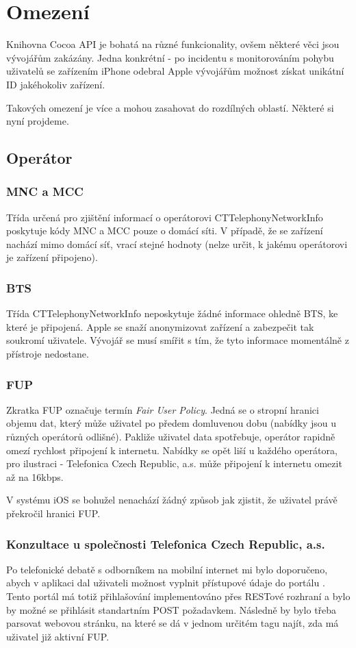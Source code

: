\newpage

\section{Omezení}
Knihovna Cocoa API je bohatá na různé funkcionality, ovšem některé věci jsou vývojářům zakázány. Jedna konkrétní - po incidentu s monitorováním pohybu uživatelů se zařízením iPhone odebral Apple vývojářům možnost získat unikátní ID jakéhokoliv zařízení.

Takových omezení je více a mohou zasahovat do rozdílných oblastí. Některé si nyní projdeme.
\subsection{Operátor}
\subsubsection*{MNC a MCC}
Třída určená pro zjištění informací o operátorovi CTTelephonyNetworkInfo poskytuje kódy MNC a MCC pouze o domácí síti. V případě, že se zařízení nachází mimo domácí síť, vrací stejné hodnoty (nelze určit, k jakému operátorovi je zařízení připojeno).
\subsubsection*{BTS}
Třída CTTelephonyNetworkInfo neposkytuje žádné informace ohledně BTS, ke které je připojená. Apple se snaží anonymizovat zařízení a zabezpečit tak soukromí uživatele. Vývojář se musí smířit s tím, že tyto informace momentálně z přístroje nedostane.
\subsubsection{FUP}
Zkratka FUP označuje termín \emph{Fair User Policy}. Jedná se o stropní hranici objemu dat, který může uživatel  po předem domluvenou dobu (nabídky jsou u různých operátorů odlišné). Pakliže uživatel data spotřebuje, operátor rapidně omezí rychlost připojení k internetu. Nabídky se opět liší u každého operátora, pro ilustraci - Telefonica Czech Republic, a.s. může připojení k internetu omezit až na 16kbps. \cite{ODVA}

V systému iOS se bohužel nenachází žádný způsob jak zjistit, že uživatel právě překročil hranici FUP. 
\subsubsection*{Konzultace u společnosti Telefonica Czech Republic, a.s.}
Po telefonické debatě s odborníkem na mobilní internet mi bylo doporučeno, abych v aplikaci dal uživateli možnost vyplnit přístupové údaje do portálu . Tento portál má totiž přihlašování implementováno přes RESTové rozhraní a bylo by možné se přihlásit standartním POST požadavkem. Následně by bylo třeba parsovat webovou stránku, na které se dá v jednom určitém tagu najít, zda má uživatel již aktivní FUP.


